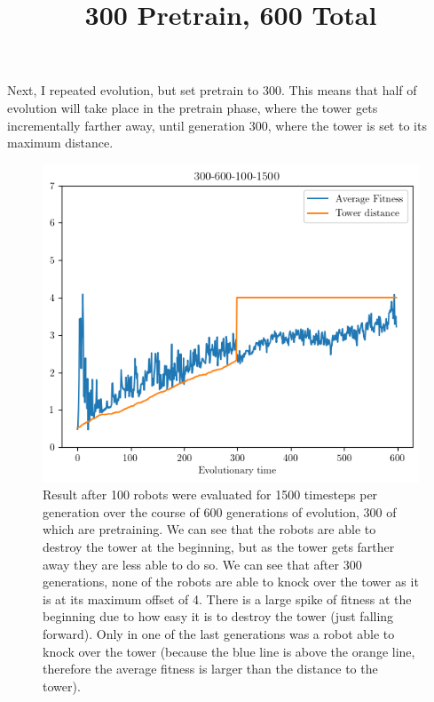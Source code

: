\documentclass[12pt, a4paper]{article}
\begin{document}
Next, I repeated evolution, but set pretrain to 300. This means that half of evolution will take place in the pretrain phase, where the tower gets incrementally farther away, until generation 300, where the tower is set to its maximum distance.



\begin{figure}[h]
\title{300 Pretrain, 600 Total}
\centering
\includegraphics[width=1\textwidth]{300-600-100-1500/300-600-100-1500.png}
\caption{Result after 100 robots were evaluated for 1500 timesteps per generation over the course of 600 generations of evolution, 300 of which are pretraining. We can see that the robots are able to destroy the tower at the beginning, but as the tower gets farther away they are less able to do so. We can see that after 300 generations, none of the robots are able to knock over the tower as it is at its maximum offset of 4. There is a large spike of fitness at the beginning due to how easy it is to destroy the tower (just falling forward). Only in one of the last generations was a robot able to knock over the tower (because the blue line is above the orange line, therefore the average fitness is larger than the distance to the tower).}
\end{figure}
\end{document}
